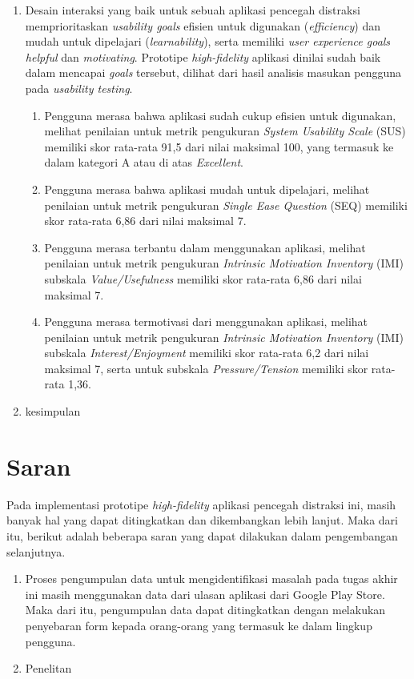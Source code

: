 \begin{enumerate}
  \item Desain interaksi yang baik untuk sebuah aplikasi pencegah distraksi memprioritaskan \textit{usability goals} efisien untuk digunakan (\textit{efficiency}) dan mudah untuk dipelajari (\textit{learnability}), serta memiliki \textit{user experience goals} \textit{helpful} dan \textit{motivating}. Prototipe \textit{high-fidelity} aplikasi dinilai sudah baik dalam mencapai \textit{goals} tersebut, dilihat dari hasil analisis masukan pengguna pada \textit{usability testing}.
    \begin{enumerate}[label=\alph*.]
      \item Pengguna merasa bahwa aplikasi sudah cukup efisien untuk digunakan, melihat penilaian untuk metrik pengukuran \textit{System Usability Scale} (SUS) memiliki skor rata-rata 91,5 dari nilai maksimal 100, yang termasuk ke dalam kategori A atau di atas \textit{Excellent}. 
      
      \item Pengguna merasa bahwa aplikasi mudah untuk dipelajari, melihat penilaian untuk metrik pengukuran \textit{Single Ease Question} (SEQ) memiliki skor rata-rata 6,86 dari nilai maksimal 7.
      
      \item Pengguna merasa terbantu dalam menggunakan aplikasi, melihat penilaian untuk metrik pengukuran \textit{Intrinsic Motivation Inventory} (IMI) subskala \textit{Value/Usefulness} memiliki skor rata-rata 6,86 dari nilai maksimal 7.
      
      \item Pengguna merasa termotivasi dari menggunakan aplikasi, melihat penilaian untuk metrik pengukuran \textit{Intrinsic Motivation Inventory} (IMI) subskala \textit{Interest/Enjoyment} memiliki skor rata-rata 6,2 dari nilai maksimal 7, serta untuk subskala \textit{Pressure/Tension} memiliki skor rata-rata 1,36.
        
    \end{enumerate}
    
  \item kesimpulan
   
\end{enumerate}

\section{Saran}
Pada implementasi prototipe \textit{high-fidelity} aplikasi pencegah distraksi ini, masih banyak hal yang dapat ditingkatkan dan dikembangkan lebih lanjut. Maka dari itu, berikut adalah beberapa saran yang dapat dilakukan dalam pengembangan selanjutnya.

\begin{enumerate}
  \item Proses pengumpulan data untuk mengidentifikasi masalah pada tugas akhir ini masih menggunakan data dari ulasan aplikasi dari Google Play Store. Maka dari itu, pengumpulan data dapat ditingkatkan dengan melakukan penyebaran form kepada orang-orang yang termasuk ke dalam lingkup pengguna.
  \item Penelitan 
\end{enumerate}
